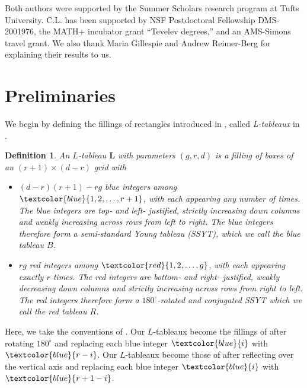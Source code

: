 \documentclass[12pt]{amsart}
\def\bL{\mathbf{L}}
\newtheorem{definition}{Definition}[section]
\begin{document}
Both authors were supported by the Summer Scholars research program at Tufts University.  C.L. has been supported by NSF Postdoctoral Fellowship DMS-2001976, the MATH+ incubator grant “Tevelev degrees,” and an AMS-Simons travel grant. We also thank Maria Gillespie and Andrew Reimer-Berg for explaining their results to us.

\section{Preliminaries}\label{sec:prelim}



We begin by defining the fillings of rectangles introduced in \cite[Propositon 4.1]{fl}, called \emph{L-tableaux} in \cite{GenRSK}. 

\begin{definition}\label{Ltableaux}
An \emph{$L$-tableau} $\bL$ with parameters $(g,r,d)$ is a filling of boxes of an $(r+1)\times (d-r)$ grid with
\begin{itemize}
    \item $(d-r)(r+1)-rg$ \color{blue} blue \color{black} integers among $\textcolor{blue}{1,2,\ldots, r+1}$, with each appearing any number of times. The blue integers are top- and left- justified, strictly increasing down columns and weakly increasing across rows from left to right. The blue integers therefore form a semi-standard Young tableau (SSYT), which we call the \emph{blue tableau} $B$.

    \item $rg$ \color{red}red \color{black} integers among $\textcolor{red}{1,2,\ldots, g}$, with each appearing exactly $r$ times. The red integers are bottom- and right- justified, weakly decreasing down columns and strictly increasing across rows from right to left. The red integers therefore form a $180^\circ$-rotated and conjugated SSYT which we call the \emph{red tableau} $R$.
\end{itemize}
\end{definition}
Here, we take the conventions of \cite{tev_Pr}. Our $L$-tableaux become the fillings of \cite[Proposition 4.1]{fl} after rotating $180^\circ$ and replacing each blue integer $\textcolor{blue}{i}$ with $\textcolor{blue}{r-i}$. Our $L$-tableaux become those of \cite{GenRSK} after reflecting over the vertical axis and replacing each blue integer $\textcolor{blue}{i}$ with $\textcolor{blue}{r+1-i}$.
\end{document}
